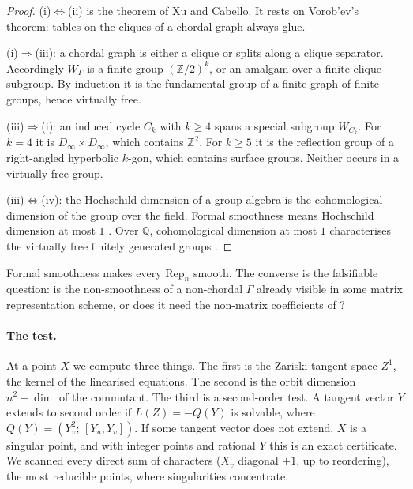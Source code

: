 \documentclass[11pt]{article}
\theoremstyle{definition}\newtheorem{definition}[theorem]{Definition}\newtheorem{remark}[theorem]{Remark}\newtheorem{example}[theorem]{Example}
\begin{document}
\begin{proof}
(i)$\Leftrightarrow$(ii) is the theorem of Xu and Cabello. It rests on Vorob'ev's theorem: tables on the cliques of a chordal graph
always glue.

(i)$\Rightarrow$(iii): a chordal graph is either a clique or splits along a clique separator. Accordingly $W_\Gamma$ is a finite group
$(\mathbb Z/2)^k$, or an amalgam over a finite clique subgroup. By induction it is the fundamental group of a finite graph of finite
groups, hence virtually free.

(iii)$\Rightarrow$(i): an induced cycle $C_k$ with $k\ge4$ spans a special subgroup $W_{C_k}$. For $k=4$ it is
$D_\infty\times D_\infty$, which contains $\mathbb Z^2$. For $k\ge5$ it is the reflection group of a right-angled hyperbolic $k$-gon,
which contains surface groups. Neither occurs in a virtually free group.

(iii)$\Leftrightarrow$(iv): the Hochschild dimension of a group algebra is the cohomological dimension of the group over the field.
Formal smoothness means Hochschild dimension at most $1$ \cite{CuntzQuillen1995}. Over $\mathbb Q$, cohomological dimension at most $1$
characterises the virtually free finitely generated groups \cite{Dunwoody1979}.
\end{proof}

Formal smoothness makes every $\mathrm{Rep}_n$ smooth. The converse is the falsifiable question: is the non-smoothness of a non-chordal
$\Gamma$ already visible in some matrix representation scheme, or does it need the non-matrix coefficients of \cite{Li2026}?

\paragraph{The test.}
At a point $X$ we compute three things. The first is the Zariski tangent space $Z^1$, the kernel of the linearised equations. The second
is the orbit dimension $n^2-\dim$ of the commutant. The third is a second-order test. A tangent vector $Y$ extends to second order if
$L(Z)=-Q(Y)$ is solvable, where $Q(Y)=(Y_v^2;\,[Y_u,Y_v])$. If some tangent vector does not extend, $X$ is a singular point, and with
integer points and rational $Y$ this is an exact certificate. We scanned every direct sum of characters ($X_v$ diagonal $\pm1$, up to
reordering), the most reducible points, where singularities concentrate.
\end{document}
